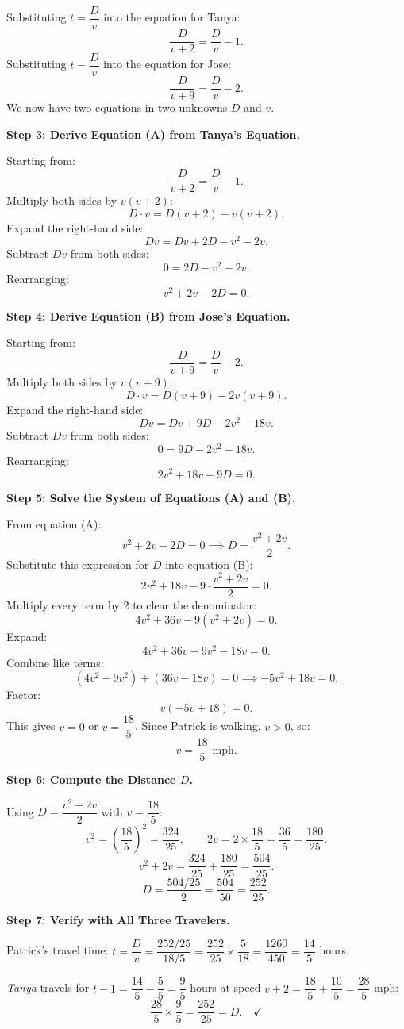 \documentclass{article}
\begin{document}
\begin{tcolorbox}[title=The early training stage model (scaled):, breakable]
Substituting $t = \dfrac{D}{v}$ into the equation for Tanya:
\[
\frac{D}{v+2} = \frac{D}{v} - 1.
\]
Substituting $t = \dfrac{D}{v}$ into the equation for Jose:
\[
\frac{D}{v+9} = \frac{D}{v} - 2.
\]
We now have two equations in two unknowns $D$ and $v$.

\medskip
\textbf{Step 3: Derive Equation (A) from Tanya's Equation.}

Starting from:
\[
\frac{D}{v+2} = \frac{D}{v} - 1.
\]
Multiply both sides by $v(v+2)$:
\[
D \cdot v = D(v+2) - v(v+2).
\]
Expand the right-hand side:
\[
Dv = Dv + 2D - v^2 - 2v.
\]
Subtract $Dv$ from both sides:
\[
0 = 2D - v^2 - 2v.
\]
Rearranging:
\[
v^2 + 2v - 2D = 0. \tag{A}
\]

\medskip
\textbf{Step 4: Derive Equation (B) from Jose's Equation.}

Starting from:
\[
\frac{D}{v+9} = \frac{D}{v} - 2.
\]
Multiply both sides by $v(v+9)$:
\[
D \cdot v = D(v+9) - 2v(v+9).
\]
Expand the right-hand side:
\[
Dv = Dv + 9D - 2v^2 - 18v.
\]
Subtract $Dv$ from both sides:
\[
0 = 9D - 2v^2 - 18v.
\]
Rearranging:
\[
2v^2 + 18v - 9D = 0. \tag{B}
\]

\medskip
\textbf{Step 5: Solve the System of Equations (A) and (B).}

From equation (A):
\[
v^2 + 2v - 2D = 0 \implies D = \frac{v^2 + 2v}{2}.
\]
Substitute this expression for $D$ into equation (B):
\[
2v^2 + 18v - 9 \cdot \frac{v^2+2v}{2} = 0.
\]
Multiply every term by 2 to clear the denominator:
\[
4v^2 + 36v - 9(v^2+2v) = 0.
\]
Expand:
\[
4v^2 + 36v - 9v^2 - 18v = 0.
\]
Combine like terms:
\[
(4v^2 - 9v^2) + (36v - 18v) = 0 \implies -5v^2 + 18v = 0.
\]
Factor:
\[
v(-5v + 18) = 0.
\]
This gives $v = 0$ or $v = \dfrac{18}{5}$. Since Patrick is walking, $v > 0$,
so:
\[
v = \frac{18}{5} \text{ mph}.
\]

\medskip
\textbf{Step 6: Compute the Distance $D$.}

Using $D = \dfrac{v^2+2v}{2}$ with $v = \dfrac{18}{5}$:
\[
v^2 = \left(\frac{18}{5}\right)^2 = \frac{324}{25},
\qquad
2v = 2 \times \frac{18}{5} = \frac{36}{5} = \frac{180}{25}.
\]
\[
v^2 + 2v = \frac{324}{25} + \frac{180}{25} = \frac{504}{25}.
\]
\[
D = \frac{504/25}{2} = \frac{504}{50} = \frac{252}{25}.
\]

\medskip
\textbf{Step 7: Verify with All Three Travelers.}

Patrick's travel time: $t = \dfrac{D}{v} = \dfrac{252/25}{18/5}
= \dfrac{252}{25} \times \dfrac{5}{18} = \dfrac{1260}{450} = \dfrac{14}{5}$
hours.

\medskip
\textit{Tanya} travels for $t - 1 = \dfrac{14}{5} - \dfrac{5}{5} = \dfrac{9}{5}$
hours at speed $v+2 = \dfrac{18}{5}+\dfrac{10}{5} = \dfrac{28}{5}$ mph:
\[
\frac{28}{5} \times \frac{9}{5} = \frac{252}{25} = D. \quad \checkmark
\]


\end{tcolorbox}
\end{document}
